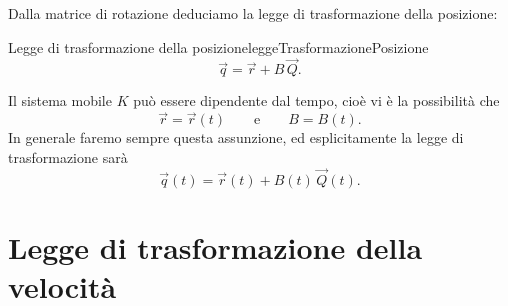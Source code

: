 Dalla matrice di rotazione deduciamo la legge di trasformazione della posizione:

\begin{remark}{Legge di trasformazione della posizione}{leggeTrasformazionePosizione}
	\[
		\vec{q} = \vec{r} + B\,\vec{Q}.
	\]
\end{remark}

\begin{oss}
	Il sistema mobile \(K\) può essere dipendente dal tempo, cioè vi è la possibilità che
	\[
		\vec{r} = \vec{r}(t) \qquad\text{e}\qquad B=B(t).
	\]
	In generale faremo sempre questa assunzione, ed esplicitamente la legge di trasformazione sarà
	\[
		\vec{q}(t) = \vec{r}(t) + B(t)\,\vec{Q}(t).
	\]
\end{oss}

\section{Legge di trasformazione della velocità}

